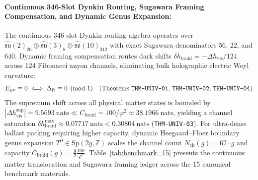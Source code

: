 \documentclass[11pt,onecolumn]{article}
\begin{document}
\paragraph{Continuous 346-Slot Dynkin Routing, Sugawara Framing Compensation, and Dynamic Genus Expansion:}
The continuous 346-slot Dynkin routing algebra operates over $\hat{\mathfrak{su}}(2)_{26} \oplus \hat{\mathfrak{su}}(3)_8 \oplus \hat{\mathfrak{so}}(10)_{312}$ with exact Sugawara denominators $56$, $22$, and $640$. Dynamic framing compensation routes dark shifts $\delta h_{\text{braid}} = -\Delta h_{\text{vis}}/124$ across 124 Fibonacci anyon channels, eliminating bulk holographic electric Weyl curvature:
\begin{equation}
E_{\mu\nu} \equiv 0 \iff \Delta_{\text{fr}} \equiv 0 \pmod 1 \quad (\text{Theorems \texttt{THM-UNIV-01}, \texttt{THM-UNIV-02}, \texttt{THM-UNIV-04}}).
\end{equation}
The supremum shift across all physical matter states is bounded by $|\Delta h_{\text{vis}}^{\sup}| = 9.5693~\text{nats} \ll C_{\text{braid}} = 100/\varphi^2 \approx 38.1966~\text{nats}$, yielding a channel saturation $\delta h_{\text{braid}}^{\max} \approx 0.07717~\text{nats} < 0.30804~\text{nats}$ (\texttt{THM-UNIV-03}). For ultra-dense ballast packing requiring higher capacity, dynamic Heegaard--Floer boundary genus expansion $T^\partial \in \mathrm{Sp}(2g, \mathbb{Z})$ scales the channel count $N_{\text{ch}}(g) = 62\cdot g$ and capacity $C_{\text{braid}}(g) = \frac{g}{2} \frac{100}{\varphi^2}$. Table~\ref{tab:benchmark_15} presents the continuous matter translocation and Sugawara framing ledger across the 15 canonical benchmark materials.
\end{document}

